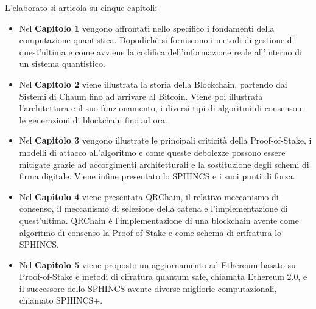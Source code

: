 L'elaborato si articola su cinque capitoli:
\begin{itemize}
  \item Nel \textbf{Capitolo 1} vengono affrontati nello specifico i fondamenti della computazione quantistica. Dopodichè si forniscono i metodi di gestione di quest'ultima e come avviene la codifica dell'informazione reale all'interno di un sistema quantistico.
  \item Nel \textbf{Capitolo 2} viene illustrata la storia della Blockchain, partendo dai Sistemi di Chaum fino ad arrivare al Bitcoin. Viene poi illustrata l'architettura e il suo funzionamento, i diversi tipi di algoritmi di consenso e le generazioni di blockchain fino ad ora.
  \item Nel \textbf{Capitolo 3} vengono illustrate le principali criticità della Proof-of-Stake, i modelli di attacco all'algoritmo e come queste debolezze possono essere mitigate grazie ad accorgimenti architetturali e la sostituzione degli schemi di firma digitale. Viene infine presentato lo SPHINCS e i suoi punti di forza.
  \item Nel \textbf{Capitolo 4} viene presentata QRChain, il relativo meccanismo di consenso, il meccanismo di selezione della catena e l'implementazione di quest'ultima. QRChain è l'implementazione di una blockchain avente come algoritmo di consenso la Proof-of-Stake e come schema di crifratura lo SPHINCS.
  \item Nel \textbf{Capitolo 5} viene proposto un aggiornamento ad Ethereum basato su Proof-of-Stake e metodi di cifratura quantum safe, chiamata Ethereum 2.0, e il successore dello SPHINCS avente diverse migliorie computazionali, chiamato SPHINCS+. 
\end{itemize}
